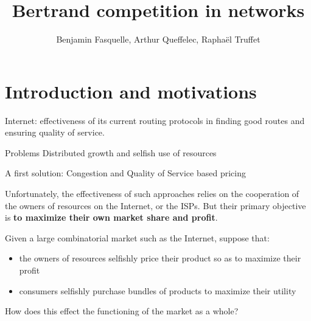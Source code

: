 \documentclass{beamer}
\title{Bertrand competition in networks}
\author{Benjamin Fasquelle, Arthur Queffelec, Raphaël Truffet}
\institute{École Normale Supérieure de Rennes, département Informatique et Télécommunications}
\begin{document}



  \begin{frame}
  \titlepage
  \end{frame}


\begin{frame}
  \tableofcontents
  \end{frame}


\section{Introduction and motivations}

\begin{frame}
Internet: effectiveness of its current routing protocols in finding good routes and ensuring quality
of service. 

\begin{alertblock}{Problems}
Distributed growth and selfish use of resources
\end{alertblock}

\vspace{5mm}

A first solution: Congestion and Quality of Service based pricing

\vspace{5mm}

Unfortunately, the effectiveness of such approaches relies on the cooperation of the owners of resources on the Internet, or the ISPs.
But their primary objective is \textbf{to maximize their own market share and profit}.
\end{frame}



\begin{frame}
Given a large combinatorial
market such as the Internet, suppose that:
\begin{itemize}
\item the owners of resources selfishly price
their product so as to maximize their profit
\item consumers selfishly purchase
bundles of products to maximize their utility
\end{itemize}

\begin{alertblock}{}
How does this effect the functioning
of the market as a whole?
\end{alertblock}
\end{frame}
\end{document}
